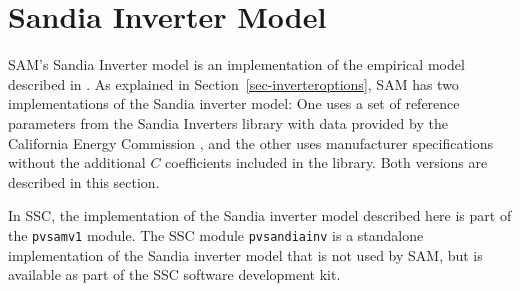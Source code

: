 \documentclass[12pt,letterpaper]{article}
\begin{document}
\section{Sandia Inverter Model}\label{sec-sandiainverter}

SAM's Sandia Inverter model is an implementation of the empirical model described in \citet{king2007}. As explained in Section~\ref{sec-inverteroptions}, SAM has two implementations of the Sandia inverter model: One uses  a set of reference parameters from the Sandia Inverters library with data provided by the California Energy Commission \citep{gsc2014a}, and the other uses manufacturer specifications without the additional $C$ coefficients included in the library. Both versions are described in this section.

In SSC, the implementation of the Sandia inverter model described here is part of the \texttt{pvsamv1} module. The SSC module \texttt{pvsandiainv} is a standalone implementation of the Sandia inverter model that is not used by SAM, but is available as part of the SSC software development kit.
\end{document}
